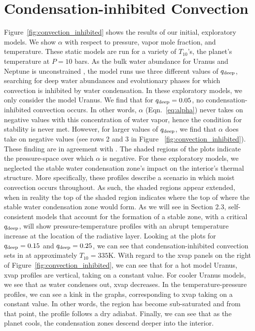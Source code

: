 \documentclass[11pt]{ucscthesisbs}
\begin{document}
\section{Condensation-inhibited Convection}
Figure~\ref{fig:convection_inhibited} shows the results of our initial, exploratory models. We show $\alpha$ with respect to pressure, vapor mole fraction, and temperature. These static models are run for a variety of $T_{10}$'s, the planet's temperature at $P=10$ bars. As the bulk water abundance for Uranus and Neptune is unconstrained \citep{guillot_1995}, the model runs use three different values of $q_{\rm deep}$, searching for deep water abundances and evolutionary phases for which convection is inhibited by water condensation. In these exploratory models, we only consider the model Uranus. We find that for $q_{\rm deep} = 0.05$, no condensation-inhibited convection occurs. In other words, $\alpha$ (Eqn.~\ref{eq:alpha})  never takes on negative values with this concentration of water vapor, hence the condition for stability is never met. However, for larger values of $q_{\rm deep}$, we find that $\alpha$ does take{} on negative values (see rows 2 and 3 in Figure ~\ref{fig:convection_inhibited}). These finding are in agreement with \citep{friedson_2017,leconte_2017}. The shaded regions of the plots indicate the pressure-space over which $\alpha$ is negative. For these exploratory models, we neglected the stable water condensation zone's impact on the interior's thermal structure. More specifically, these profiles describe a scenario in which moist convection occurs throughout. As such, the shaded regions appear extended, when in reality the top of the shaded region indicates where the top of where the stable water condensation zone would form. As we will see in Section 2.3, self-consistent models that account for the formation of a stable zone, with a critical $q_{\rm deep}$, will show pressure-temperature profiles with an abrupt temperature increase at the location of the radiative layer. Looking at the plots for $q_{\rm deep} = 0.15$ and $q_{\rm deep} = 0.25$, we can see that condensation-inhibited convection sets in at approximately $T_{10} = 335$K. With regard to the xvap panels on the right of Figure~\ref{fig:convection_inhibited}, we can see that for a hot model Uranus, xvap profiles are vertical, taking on a constant value. For cooler Uranus models, we see that as water condenses out, xvap decreases. In the temperature-pressure profiles, we can see a kink in the graphs, corresponding to xvap taking on a constant value. In other words, the region has become sub-saturated and from that point, the profile follows a dry adiabat. Finally, we can see that as the planet cools, the condensation zones descend deeper into the interior.
\end{document}

